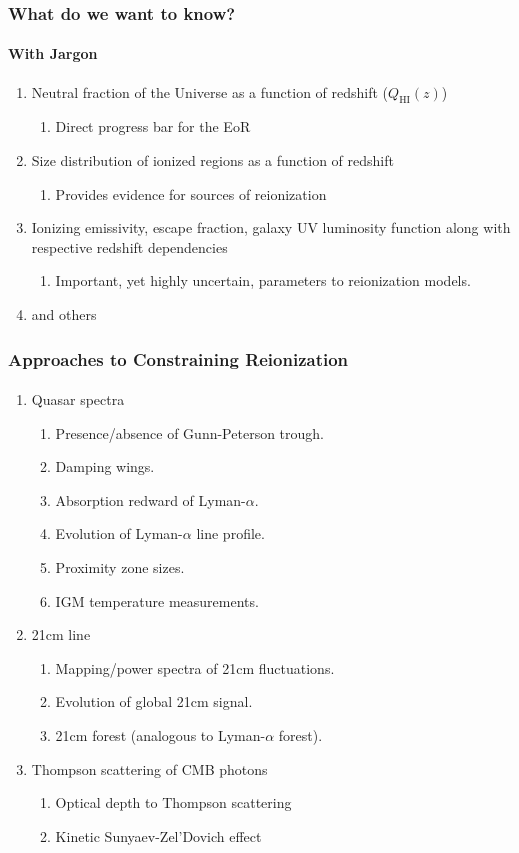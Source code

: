\documentclass{beamer}
\begin{document}
\begin{frame}
\frametitle{What do we want to know?}
\framesubtitle{With Jargon}
\begin{enumerate}[-]
\item Neutral fraction of the Universe as a function of redshift ($Q_{\text{HI}}(z)$)
\begin{enumerate}[$\to$]
\item Direct progress bar for the EoR
\end{enumerate}
\item Size distribution of ionized regions as a function of redshift
\begin{enumerate}[$\to$]
\item Provides evidence for sources of reionization
\end{enumerate}
\item Ionizing emissivity, escape fraction, galaxy UV luminosity function along with respective redshift dependencies
\begin{enumerate}[$\to$]
\item Important, yet highly uncertain, parameters to reionization models.
\end{enumerate}
\item and others
\end{enumerate}
\end{frame}

\begin{frame}
\frametitle{Approaches to Constraining Reionization}
\framesubtitle{}
\begin{enumerate}[-]
\item Quasar spectra
\begin{enumerate}[$\to$]
\item Presence/absence of Gunn-Peterson trough.
\item Damping wings.
\item Absorption redward of Lyman-$\alpha$.
\item Evolution of Lyman-$\alpha$ line profile.
\item Proximity zone sizes.
\item IGM temperature measurements.
\end{enumerate}
\item 21cm line
\begin{enumerate}[$\to$]
\item Mapping/power spectra of 21cm fluctuations.
\item Evolution of global 21cm signal.
\item 21cm forest (analogous to Lyman-$\alpha$ forest).
\end{enumerate}
\item Thompson scattering of CMB photons
\begin{enumerate}[$\to$]
\item Optical depth to Thompson scattering
\item Kinetic Sunyaev-Zel'Dovich effect
\end{enumerate}
\end{enumerate}
\end{frame}
\end{document}

